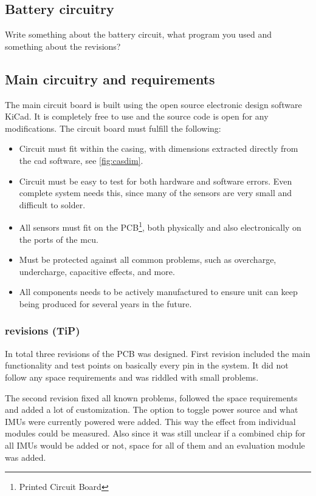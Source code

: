 \subsection{Battery circuitry}
Write something about the battery circuit, what program you used and something about the revisions?

\subsection{Main circuitry and requirements}
The main circuit board is built using the open source electronic design software KiCad\cite{kicad}. It is completely free to use and the source code is open for any modifications.
The circuit board must fulfill the following:
\begin{itemize}
\item Circuit must fit within the casing, with dimensions extracted directly from the cad software\cite{cad}, see \cref{fig:casdim}.
\item Circuit must be easy to test for both hardware and software errors. Even complete system needs this, since many of the sensors are very small and difficult to solder.
\item All sensors must fit on the PCB\footnote{Printed Circuit Board}, both physically and also electronically on the ports of the \gls{mcu}.
\item Must be protected against all common problems, such as overcharge, undercharge, capacitive effects, and more.
\item All components needs to be actively manufactured to ensure unit can keep being produced for several years in the future.
\end{itemize}

\subsubsection{revisions (TiP)}
In total three revisions of the PCB was designed. First revision included the main functionality and test points on basically every pin in the system. It did not follow any space requirements and was riddled with small problems.

The second revision fixed all known problems, followed the space requirements and added a lot of customization. The option to toggle power source and what IMUs were currently powered were added. This way the effect from individual modules could be measured. Also since it was still unclear if a combined chip for all IMUs would be added or not, space for all of them and an evaluation module was added.

